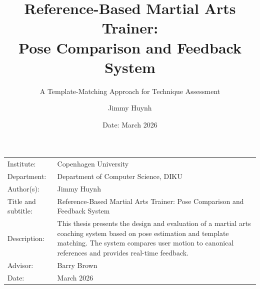 \documentclass[12pt]{article}
\author{Jimmy Huynh}
\title{Reference-Based Martial Arts Trainer: \\ Pose Comparison and Feedback System}
\subtitle{A Template-Matching Approach for Technique Assessment}
\date{Date: {March 2026}}
\begin{document}
\maketitle

\onehalfspacing

\begin{table}[h]
\def\arraystretch{1.5}
\begin{tabularx}{\textwidth}{l X}
Institute: & {Copenhagen University}  \\
Department: & {Department of Computer Science, DIKU} \\
Author(s): & {Jimmy Huynh} \\
Title and subtitle: & {Reference-Based Martial Arts Trainer: Pose Comparison and Feedback System} \\
Description: & This thesis presents the design and evaluation of a martial arts coaching system based on pose estimation and template matching. The system compares user motion to canonical references and provides real-time feedback. \\
Advisor: & {Barry Brown} \\
Date: & {March 2026}
\end{tabularx}
\end{table}
\newpage

\tableofcontents
\newpage
\end{document}
